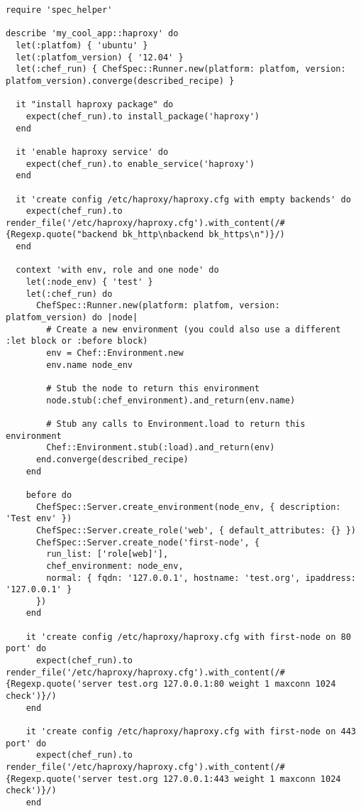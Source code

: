 \begin{lstlisting}[label=lst:testing-chef-zero15]
require 'spec_helper'

describe 'my_cool_app::haproxy' do
  let(:platfom) { 'ubuntu' }
  let(:platfom_version) { '12.04' }
  let(:chef_run) { ChefSpec::Runner.new(platform: platfom, version: platfom_version).converge(described_recipe) }

  it "install haproxy package" do
    expect(chef_run).to install_package('haproxy')
  end

  it 'enable haproxy service' do
    expect(chef_run).to enable_service('haproxy')
  end

  it 'create config /etc/haproxy/haproxy.cfg with empty backends' do
    expect(chef_run).to render_file('/etc/haproxy/haproxy.cfg').with_content(/#{Regexp.quote("backend bk_http\nbackend bk_https\n")}/)
  end

  context 'with env, role and one node' do
    let(:node_env) { 'test' }
    let(:chef_run) do
      ChefSpec::Runner.new(platform: platfom, version: platfom_version) do |node|
        # Create a new environment (you could also use a different :let block or :before block)
        env = Chef::Environment.new
        env.name node_env

        # Stub the node to return this environment
        node.stub(:chef_environment).and_return(env.name)

        # Stub any calls to Environment.load to return this environment
        Chef::Environment.stub(:load).and_return(env)
      end.converge(described_recipe)
    end

    before do
      ChefSpec::Server.create_environment(node_env, { description: 'Test env' })
      ChefSpec::Server.create_role('web', { default_attributes: {} })
      ChefSpec::Server.create_node('first-node', {
        run_list: ['role[web]'],
        chef_environment: node_env,
        normal: { fqdn: '127.0.0.1', hostname: 'test.org', ipaddress: '127.0.0.1' }
      })
    end

    it 'create config /etc/haproxy/haproxy.cfg with first-node on 80 port' do
      expect(chef_run).to render_file('/etc/haproxy/haproxy.cfg').with_content(/#{Regexp.quote('server test.org 127.0.0.1:80 weight 1 maxconn 1024 check')}/)
    end

    it 'create config /etc/haproxy/haproxy.cfg with first-node on 443 port' do
      expect(chef_run).to render_file('/etc/haproxy/haproxy.cfg').with_content(/#{Regexp.quote('server test.org 127.0.0.1:443 weight 1 maxconn 1024 check')}/)
    end


\end{lstlisting}
